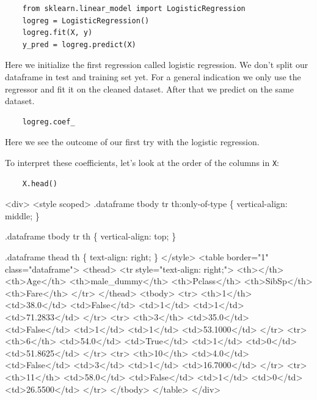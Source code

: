 \documentclass[11pt]{article}
\begin{document}
\begin{verbatim}
    from sklearn.linear_model import LogisticRegression
    logreg = LogisticRegression()
    logreg.fit(X, y)
    y_pred = logreg.predict(X)
\end{verbatim}

Here we initialize the first regression called logistic regression. We
don't split our dataframe in test and training set yet. For a general
indication we only use the regressor and fit it on the cleaned dataset.
After that we predict on the same dataset.

\begin{verbatim}
    logreg.coef_
\end{verbatim}

Here we see the outcome of our first try with the logistic regression.

To interpret these coefficients, let's look at the order of the columns
in \texttt{X}:

\begin{verbatim}
    X.head()
\end{verbatim}

\begin{HTML}
<div>
<style scoped>
    .dataframe tbody tr th:only-of-type \{
	vertical-align: middle;
    \}

.dataframe tbody tr th \{
    vertical-align: top;
\}

    .dataframe thead th \{
	text-align: right;
    \}
</style>
<table border="1" class="dataframe">
  <thead>
    <tr style="text-align: right;">
      <th></th>
      <th>Age</th>
      <th>male\_dummy</th>
      <th>Pclass</th>
      <th>SibSp</th>
      <th>Fare</th>
    </tr>
  </thead>
  <tbody>
    <tr>
      <th>1</th>
      <td>38.0</td>
      <td>False</td>
      <td>1</td>
      <td>1</td>
      <td>71.2833</td>
    </tr>
    <tr>
      <th>3</th>
      <td>35.0</td>
      <td>False</td>
      <td>1</td>
      <td>1</td>
      <td>53.1000</td>
    </tr>
    <tr>
      <th>6</th>
      <td>54.0</td>
      <td>True</td>
      <td>1</td>
      <td>0</td>
      <td>51.8625</td>
    </tr>
    <tr>
      <th>10</th>
      <td>4.0</td>
      <td>False</td>
      <td>3</td>
      <td>1</td>
      <td>16.7000</td>
    </tr>
    <tr>
      <th>11</th>
      <td>58.0</td>
      <td>False</td>
      <td>1</td>
      <td>0</td>
      <td>26.5500</td>
    </tr>
  </tbody>
</table>
</div>
\end{HTML}
\end{document}
